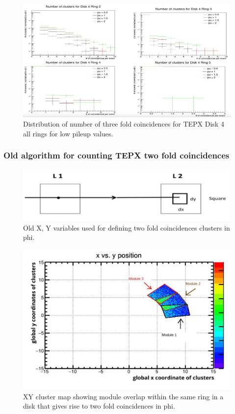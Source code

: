 \begin{figure}[H]
  \centering
  \includegraphics[width=1\columnwidth]{ashish_thesis/tepx_D4_3foldcoin_lowpu.png}
  \caption{Distribution of number of three fold coincidences for TEPX Disk 4 all rings for low pileup values.}
  \label{fig:tepx_3foldcoin_allPU}
\end{figure}

\subsubsection{Old algorithm for counting TEPX two fold coincidences}

\begin{figure}[!htp]
\centering
\includegraphics[width=1\textwidth]{ashish_thesis/oldvariable_xy.png}
\caption{%
   Old X, Y variables used for defining two fold coincidences clusters in phi.
}
\label{fig:oldvar_xy}
\end{figure}


\begin{figure}[!htp]
\centering
\includegraphics[width=1\textwidth]{ashish_thesis/overlap_modules2_Ring1.png}
\caption{%
 XY cluster map showing module overlap within the same ring in a disk that gives rise to two fold coincidences in phi.
}
\label{fig:overlap_2foldinphi}
\end{figure}




